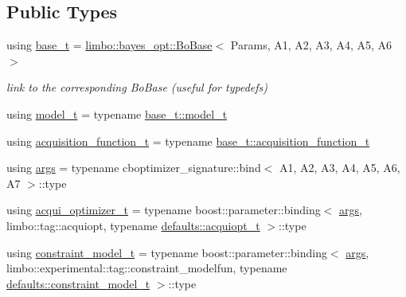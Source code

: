 \subsection*{Public Types}
\begin{DoxyCompactItemize}
\item 
using \hyperlink{classlimbo_1_1experimental_1_1bayes__opt_1_1_c_b_optimizer_a6439aea347906e0e45063d74ee618a29}{base\+\_\+t} = \hyperlink{classlimbo_1_1bayes__opt_1_1_bo_base}{limbo\+::bayes\+\_\+opt\+::\+Bo\+Base}$<$ Params, A1, A2, A3, A4, A5, A6 $>$
\begin{DoxyCompactList}\small\item\em link to the corresponding Bo\+Base (useful for typedefs) \end{DoxyCompactList}\item 
using \hyperlink{classlimbo_1_1experimental_1_1bayes__opt_1_1_c_b_optimizer_ac4e7081d6af43c4e0d251998795717ca}{model\+\_\+t} = typename \hyperlink{classlimbo_1_1bayes__opt_1_1_bo_base_a5e23d523dd2a16b866a2660721b937bb}{base\+\_\+t\+::model\+\_\+t}
\item 
using \hyperlink{classlimbo_1_1experimental_1_1bayes__opt_1_1_c_b_optimizer_a3bef2b5e755af502e47a669dce9398f9}{acquisition\+\_\+function\+\_\+t} = typename \hyperlink{classlimbo_1_1bayes__opt_1_1_bo_base_a5abe502b49e1ee70d5e00f27f95f5dff}{base\+\_\+t\+::acquisition\+\_\+function\+\_\+t}
\item 
using \hyperlink{classlimbo_1_1experimental_1_1bayes__opt_1_1_c_b_optimizer_a0b62d16abcb5eec9dbd4b37222137c26}{args} = typename cboptimizer\+\_\+signature\+::bind$<$ A1, A2, A3, A4, A5, A6, A7 $>$\+::type
\item 
using \hyperlink{classlimbo_1_1experimental_1_1bayes__opt_1_1_c_b_optimizer_aa3b86d243d0d118a1c2f39bb00663c80}{acqui\+\_\+optimizer\+\_\+t} = typename boost\+::parameter\+::binding$<$ \hyperlink{classlimbo_1_1bayes__opt_1_1_bo_base_a800d7d9dec5ac0c12b93150f12db9be3}{args}, limbo\+::tag\+::acquiopt, typename \hyperlink{structlimbo_1_1experimental_1_1bayes__opt_1_1_c_b_optimizer_1_1defaults_a4c7662e52d7a08fab22774eae4cb5822}{defaults\+::acquiopt\+\_\+t} $>$\+::type
\item 
using \hyperlink{classlimbo_1_1experimental_1_1bayes__opt_1_1_c_b_optimizer_a5cb12c91d5ba4ea49768779178c6a2c6}{constraint\+\_\+model\+\_\+t} = typename boost\+::parameter\+::binding$<$ \hyperlink{classlimbo_1_1bayes__opt_1_1_bo_base_a800d7d9dec5ac0c12b93150f12db9be3}{args}, limbo\+::experimental\+::tag\+::constraint\+\_\+modelfun, typename \hyperlink{structlimbo_1_1experimental_1_1bayes__opt_1_1_c_b_optimizer_1_1defaults_a732a30715b9697aad5c6587cca6acfd3}{defaults\+::constraint\+\_\+model\+\_\+t} $>$\+::type
\end{DoxyCompactItemize}
